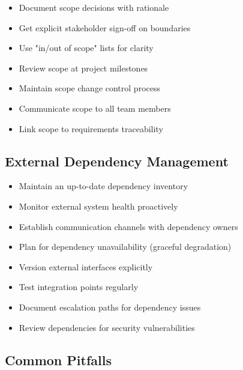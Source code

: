 \documentclass[11pt,letterpaper]{article}
\begin{document}
\begin{contextbox}
\begin{itemize}[nosep]
    \item Document scope decisions with rationale
    \item Get explicit stakeholder sign-off on boundaries
    \item Use "in/out of scope" lists for clarity
    \item Review scope at project milestones
    \item Maintain scope change control process
    \item Communicate scope to all team members
    \item Link scope to requirements traceability
\end{itemize}
\end{contextbox}

\subsection{External Dependency Management}

\begin{boundarybox}
\begin{itemize}[nosep]
    \item Maintain an up-to-date dependency inventory
    \item Monitor external system health proactively
    \item Establish communication channels with dependency owners
    \item Plan for dependency unavailability (graceful degradation)
    \item Version external interfaces explicitly
    \item Test integration points regularly
    \item Document escalation paths for dependency issues
    \item Review dependencies for security vulnerabilities
\end{itemize}
\end{boundarybox}

\subsection{Common Pitfalls}
\end{document}
